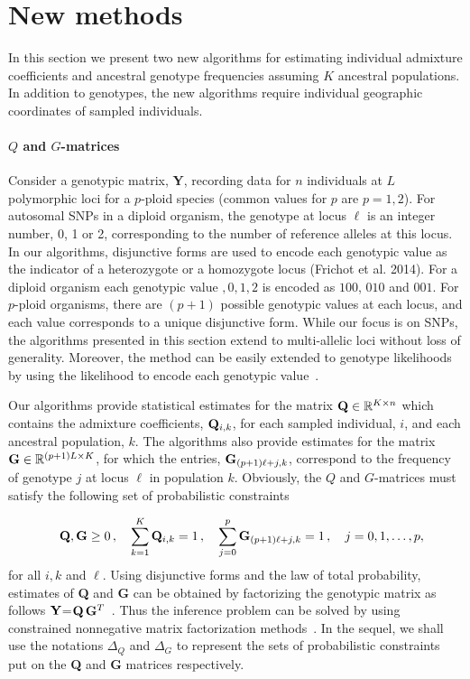 \clearpage
\newpage

\section{New methods}


In this section we present two new algorithms for estimating individual admixture coefficients and ancestral genotype frequencies assuming $K$ ancestral populations. In addition to genotypes, the new algorithms require individual geographic coordinates of sampled individuals.

\paragraph{$Q$ and $G$-matrices} Consider a genotypic matrix, {\bf Y}, recording data for $n$ individuals at $L$ polymorphic loci for a $p$-ploid species (common values for $p$ are $p = 1,2$). For autosomal SNPs in a diploid organism, the genotype at locus $\ell$  is an integer number, 0, 1 or 2, corresponding to the number of reference alleles at this locus. In our algorithms, disjunctive forms are used  to encode each genotypic value as the indicator of a heterozygote or a homozygote locus (Frichot et al. 2014). For a diploid organism each genotypic value $,0,1,2$ is encoded as $100$, $010$ and $001$. For $p$-ploid organisms, there are $(p+1)$ possible genotypic values at each locus, and each value corresponds to a unique disjunctive form. While our focus is on SNPs, the algorithms presented in this section extend to multi-allelic loci without loss of generality. 
Moreover, the method can be easily extended to genotype likelihoods by using the likelihood to encode each genotypic value~\citep{Korneliussen2014}.

Our algorithms provide statistical estimates for the matrix ${\bf Q} \in \mathbb{R}^{K \times n}$ which contains the admixture coefficients, ${\bf Q}_{i,k}$, for each sampled individual, $i$, and each ancestral population, $k$. The algorithms also provide estimates for the matrix ${\bf G} \in \mathbb{R}^{(p+1)L \times K}$, for which the entries, ${\bf G}_{(p+1)\ell + j, k}$, correspond to the frequency of genotype $j$ at locus $\ell$ in population $k$. Obviously, the $Q$ and $G$-matrices must satisfy the following set of probabilistic constraints 

$$
\quad {\bf Q},{\bf G} \geq 0 \, , \quad  \sum_{k=1}^K {\bf Q}_{i,k} = 1 \, , \quad \sum_{j=0}^p {\bf G}_{(p+1)\ell + j, k} = 1 \, , \quad j = 0,1,\dots, p,
$$
for all $i, k$ and $\ell$. Using disjunctive forms and the law of total probability, estimates of {\bf Q} and {\bf G} can be obtained by factorizing the genotypic matrix as follows ${\bf Y}$=${\bf Q}\,{\bf G}^T$~\citep{Frichot2014}. Thus the inference problem can be solved by using constrained nonnegative matrix factorization methods~\citep{Lee1999, Cichocki2009}. In the sequel, we shall use the notations  $\Delta_Q$ and $\Delta_G$ to represent the sets of probabilistic constraints put on the {\bf Q} and {\bf G} matrices respectively. 


